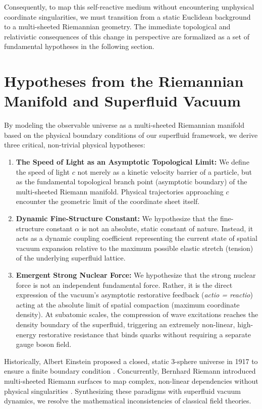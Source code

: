 \documentclass[11pt,a4paper]{article}
\theoremstyle{plain}
\theoremstyle{definition}
\theoremstyle{remark}
\begin{document}
Consequently, to map this self-reactive medium without encountering unphysical coordinate singularities, we must transition from a static Euclidean background to a multi-sheeted Riemannian geometry. The immediate topological and relativistic consequences of this change in perspective are formalized as a set of fundamental hypotheses in the following section.

\newpage
\section{Hypotheses from the Riemannian Manifold and Superfluid Vacuum}
By modeling the observable universe as a multi-sheeted Riemannian manifold based on the physical boundary conditions of our superfluid framework, we derive three critical, non-trivial physical hypotheses:
\begin{enumerate}
    \item \textbf{The Speed of Light as an Asymptotic Topological Limit:} We define the speed of light $c$ not merely as a kinetic velocity barrier of a particle, but as the fundamental topological branch point (asymptotic boundary) of the multi-sheeted Riemann manifold. Physical trajectories approaching $c$ encounter the geometric limit of the coordinate sheet itself.
    \item \textbf{Dynamic Fine-Structure Constant:} We hypothesize that the fine-structure constant $\alpha$ is not an absolute, static constant of nature. Instead, it acts as a dynamic coupling coefficient representing the current state of spatial vacuum expansion relative to the maximum possible elastic stretch (tension) of the underlying superfluid lattice.
    \item \textbf{Emergent Strong Nuclear Force:} We hypothesize that the strong nuclear force is not an independent fundamental force. Rather, it is the direct expression of the vacuum's asymptotic restorative feedback (\textit{actio = reactio}) acting at the absolute limit of spatial compaction (maximum coordinate density). At subatomic scales, the compression of wave excitations reaches the density boundary of the superfluid, triggering an extremely non-linear, high-energy restorative resistance that binds quarks without requiring a separate gauge boson field.
\end{enumerate}

Historically, Albert Einstein proposed a closed, static 3-sphere universe in 1917 to ensure a finite boundary condition \cite{einstein1917}. Concurrently, Bernhard Riemann introduced multi-sheeted Riemann surfaces to map complex, non-linear dependencies without physical singularities \cite{riemann1857}. Synthesizing these paradigms with superfluid vacuum dynamics, we resolve the mathematical inconsistencies of classical field theories.
\end{document}
